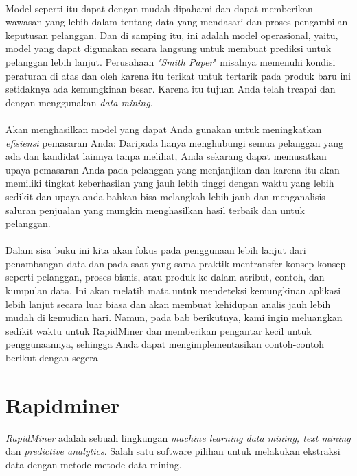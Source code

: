 \paragraph{}  Model seperti itu dapat dengan mudah dipahami dan dapat memberikan wawasan yang lebih dalam tentang data yang mendasari dan proses pengambilan keputusan pelanggan. Dan di samping itu, ini adalah model operasional, yaitu, model yang dapat digunakan secara langsung untuk membuat prediksi untuk pelanggan lebih lanjut. Perusahaan \textit{"Smith Paper}" misalnya memenuhi kondisi peraturan di atas dan oleh karena itu terikat untuk tertarik pada produk baru ini setidaknya ada kemungkinan besar. Karena itu tujuan Anda telah trcapai dan dengan menggunakan \textit{data mining}.

\paragraph{}  Akan menghasilkan model yang dapat Anda gunakan untuk meningkatkan \textit{efisiensi} pemasaran Anda: Daripada hanya menghubungi semua pelanggan yang ada dan kandidat lainnya tanpa melihat, Anda sekarang dapat memusatkan upaya pemasaran Anda pada pelanggan yang menjanjikan dan karena itu akan memiliki tingkat keberhasilan yang jauh lebih tinggi dengan waktu yang lebih sedikit dan upaya anda bahkan bisa melangkah lebih jauh dan menganalisis saluran penjualan yang mungkin menghasilkan hasil terbaik dan untuk pelanggan.

\paragraph{}  Dalam sisa buku ini kita akan fokus pada penggunaan lebih lanjut dari penambangan data dan pada saat yang sama praktik mentransfer konsep-konsep seperti pelanggan, proses bisnis, atau produk ke dalam atribut, contoh, dan kumpulan data. Ini akan melatih mata untuk mendeteksi kemungkinan aplikasi lebih lanjut secara luar biasa dan akan membuat kehidupan analis jauh lebih mudah di kemudian hari. Namun, pada bab berikutnya, kami ingin meluangkan sedikit waktu untuk RapidMiner dan memberikan pengantar kecil untuk penggunaannya, sehingga Anda dapat mengimplementasikan contoh-contoh berikut dengan segera





\section{Rapidminer}
\par \textit{RapidMiner} adalah sebuah lingkungan
\textit{machine learning data mining, text mining} dan \textit{predictive analytics}.\cite{vercellis2009business}
Salah satu software pilihan untuk melakukan ekstraksi data
dengan metode-metode data mining.\cite{cti2017implemetasi}
